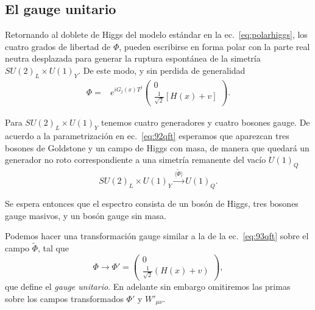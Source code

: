 \subsection{El gauge unitario}

\begin{frame}
Retornando al doblete de Higgs del modelo estándar en la ec.~\eqref{eq:polarhiggs}, los cuatro grados de libertad de $\Phi$, pueden escribirse en forma polar con la parte real neutra desplazada para generar la ruptura espontánea de la simetría $SU(2)_L\times  U(1)_Y$. De este modo, y sin perdida de generalidad
\begin{align}
\label{eq:92qft}
  {\Phi}=&e^{i G_j(x)T^j}
  \begin{pmatrix}
    0\\
    \frac{1}{\sqrt{2}}[H(x)+v]
  \end{pmatrix}.
\end{align}

Para $SU(2)_L\times  U(1)_Y$ tenemos cuatro generadores y cuatro bosones gauge. De acuerdo a la parametrización en ec.~\eqref{eq:92qft} esperamos que aparezcan tres bosones de Goldstone y un campo de Higgs con masa, de manera que quedará un generador no roto correspondiente a una simetría remanente del vacío $U(1)_Q$
\begin{equation}
  SU(2)_L\times  U(1)_Y\overset{\langle\widetilde{\Phi}\rangle}{\longrightarrow}U(1)_Q.
\end{equation}

Se espera entonces que el espectro consista de un bosón de Higgs, tres bosones gauge masivos, y un bosón gauge sin masa.

Podemos hacer una transformación gauge similar a la de la 
ec.~\eqref{eq:93qft} sobre el campo $\widetilde{\Phi}$, tal que
\begin{equation}
  \label{eq:123qft}
    {\Phi}\to{\Phi}'=
  \begin{pmatrix}
    0\\
    \frac{1}{\sqrt{2}}(H(x)+v)
  \end{pmatrix},
\end{equation}
que define el \emph{gauge unitario}. En adelante sin embargo omitiremos las primas sobre los campos transformados ${\Phi}'$ y $W'_{\mu\nu}$.


\end{frame}
